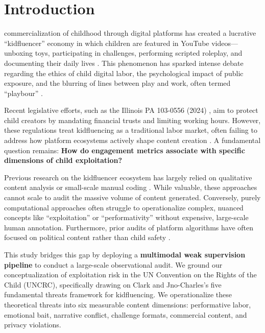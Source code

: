 \documentclass[]{ieeeaccess}
\begin{document}
\titlepgskip=-15pt

\maketitle



\section{Introduction}
 commercialization of childhood through digital platforms has created a lucrative ``kidfluencer'' economy in which children are featured in YouTube videos---unboxing toys, participating in challenges, performing scripted roleplay, and documenting their daily lives \cite{clark2025child}. This phenomenon has sparked intense debate regarding the ethics of child digital labor, the psychological impact of public exposure, and the blurring of lines between play and work, often termed ``playbour'' \cite{abidin2015micromicrocelebrity}.

Recent legislative efforts, such as the Illinois PA 103-0556 (2024) \cite{illinois2024}, aim to protect child creators by mandating financial trusts and limiting working hours. However, these regulations treat kidfluencing as a traditional labor market, often failing to address how platform ecosystems actively shape content creation \cite{unicef2025}. A fundamental question remains: \textbf{How do engagement metrics associate with specific dimensions of child exploitation?}

Previous research on the kidfluencer ecosystem has largely relied on qualitative content analysis or small-scale manual coding \cite{divon2025children,anderson2025growing}. While valuable, these approaches cannot scale to audit the massive volume of content generated. Conversely, purely computational approaches often struggle to operationalize complex, nuanced concepts like ``exploitation'' or ``performativity'' without expensive, large-scale human annotation. Furthermore, prior audits of platform algorithms \cite{huszar2022algorithmic,haroon2023auditing} have often focused on political content rather than child safety \cite{papadamou2020disturbed}.

This study bridges this gap by deploying a \textbf{multimodal weak supervision pipeline} to conduct a large-scale observational audit. We ground our conceptualization of exploitation risk in the UN Convention on the Rights of the Child (UNCRC), specifically drawing on Clark and Jno-Charles's \cite{clark2025child} five fundamental threats framework for kidfluencing. We operationalize these theoretical threats into six measurable content dimensions: performative labor, emotional bait, narrative conflict, challenge formats, commercial content, and privacy violations.
\end{document}

